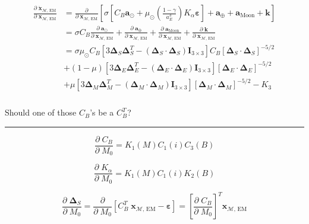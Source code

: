 \documentclass[]{article}
\newcommand{\pd}[2]{\frac{\partial\;#1}{\partial\;#2}}
\newcommand{\pddown}[2]{\frac{\partial}{\partial\;#2} \left[ #1 \right] }
\begin{document}
	\begin{align}
	\begin{split}
		\pd{\ddot{\mathbf{x}}_{\mathcal{M}\text{, EM}}}{ \mathbf{x}_{\mathcal{M}\text{, EM}} } 
		&= \pddown{\sigma \left[ C_B  \mathbf{a}_{\odot} + \mu_\odot \left(\frac{1-\gamma}{a_E^3}\right) K_\alpha \boldsymbol{\varepsilon} \right] + \mathbf{a}_\oplus +  \mathbf{a}_\text{Moon}  + \mathbf{k}}{ \mathbf{x}_{\mathcal{M}\text{, EM}} } \\
		&= \sigma C_B \pd{ \mathbf{a}_{\odot} }{ \mathbf{x}_{\mathcal{M}\text{, EM}} } + \pd{ \mathbf{a}_\oplus }{ \mathbf{x}_{\mathcal{M}\text{, EM}} } + \pd{ \mathbf{a}_\text{Moon} }{ \mathbf{x}_{\mathcal{M}\text{, EM}} } + \pd{ \mathbf{k} }{ \mathbf{x}_{\mathcal{M}\text{, EM}} } \\
		&= \sigma \mu_\odot C_B \left[ 3 \boldsymbol{\Delta}_S \boldsymbol{\Delta}_S^T - (\boldsymbol{\Delta}_S\cdot\boldsymbol{\Delta}_S) \mathbf{I}_{3\times 3} \right] C_B [\boldsymbol{\Delta}_S \cdot \boldsymbol{\Delta}_S]^{-5/2} \\
		&+ (1-\mu) \left[ 3 \boldsymbol{\Delta}_E \boldsymbol{\Delta}_E^T - (\boldsymbol{\Delta}_E\cdot\boldsymbol{\Delta}_E) \mathbf{I}_{3\times 3} \right] [\boldsymbol{\Delta}_E \cdot \boldsymbol{\Delta}_E ]^{-5/2} \\
		&+ \mu \left[ 3 \boldsymbol{\Delta}_M \boldsymbol{\Delta}_M^T - (\boldsymbol{\Delta}_M\cdot\boldsymbol{\Delta}_M) \mathbf{I}_{3\times 3} \right] [\boldsymbol{\Delta}_M \cdot \boldsymbol{\Delta}_M ]^{-5/2} - K_3 \\
	\end{split}
	\end{align}
	
	Should one of those $C_B$'s be a $C_B^T$?
	
	\hrule \vspace{1em}
	
	\begin{equation*}
		\pd{C_B}{M_0} = K_1(M) C_1(i) C_3(B)
	\end{equation*}
	
	\begin{equation*}
		\pd{K_\alpha}{M_0} = K_1(M) C_1(i) K_2(B)
	\end{equation*}
	
	\begin{equation*}
		\pd{\boldsymbol{\Delta}_S}{M_0} = \pddown{C_B^T \; \mathbf{x}_{\mathcal{M}\text{, EM}} - \boldsymbol{\varepsilon}}{M_0} = \left[ \pd{C_B}{M_0} \right]^T \mathbf{x}_{\mathcal{M}\text{, EM}}
	\end{equation*}
	
\end{document}
